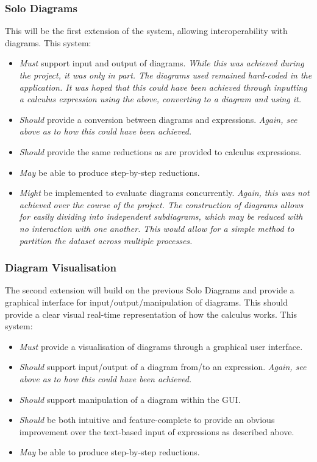     \subsubsection{Solo Diagrams}
        This will be the first extension of the system, allowing interoperability with diagrams.
        This system:
        \begin{itemize}
            \item \textit{Must} support input and output of diagrams.
                \textit{While this was achieved during the project, it was only in part.
                The diagrams used remained hard-coded in the application.
                It was hoped that this could have been achieved through inputting a calculus expression using the above, converting to a diagram and using it.}
            \item \textit{Should} provide a conversion between diagrams and expressions.
                \textit{Again, see above as to how this could have been achieved.}
            \item \textit{Should} provide the same reductions as are provided to calculus expressions.
            \item \textit{May} be able to produce step-by-step reductions.
            \item \textit{Might} be implemented to evaluate diagrams concurrently.
                \textit{Again, this was not achieved over the course of the project.
                The construction of diagrams allows for easily dividing into independent subdiagrams, which may be reduced with no interaction with one another.
                This would allow for a simple method to partition the dataset across multiple processes.}
        \end{itemize}

    \subsubsection{Diagram Visualisation}
        The second extension will build on the previous Solo Diagrams and provide a graphical interface for input/output/manipulation of diagrams.
        This should provide a clear visual real-time representation of how the calculus works.
        This system:
        \begin{itemize}
            \item \textit{Must} provide a visualisation of diagrams through a graphical user interface.
            \item \textit{Should} support input/output of a diagram from/to an expression.
                \textit{Again, see above as to how this could have been achieved.}
            \item \textit{Should} support manipulation of a diagram within the GUI.
            \item \textit{Should} be both intuitive and feature-complete to provide an obvious improvement over the text-based input of expressions as described above.
            \item \textit{May} be able to produce step-by-step reductions.
        \end{itemize}
